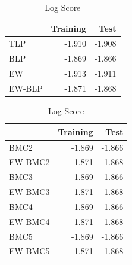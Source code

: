 \documentclass[
]{article}
\begin{document}
\begin{table}[H]
\caption{\label{tab:unnamed-chunk-5}Log Score}

\centering
\fontsize{8}{10}\selectfont
\begin{tabular}[t]{lrr}
\toprule
  & Training & Test\\
\midrule
TLP & -1.910 & -1.908\\
BLP & -1.869 & -1.866\\
EW & -1.913 & -1.911\\
EW-BLP & -1.871 & -1.868\\
\bottomrule
\end{tabular}
\centering
\begin{tabular}[t]{lrr}
\toprule
  & Training & Test\\
\midrule
BMC2 & -1.869 & -1.866\\
EW-BMC2 & -1.871 & -1.868\\
BMC3 & -1.869 & -1.866\\
EW-BMC3 & -1.871 & -1.868\\
BMC4 & -1.869 & -1.866\\
\addlinespace
EW-BMC4 & -1.871 & -1.868\\
BMC5 & -1.869 & -1.866\\
EW-BMC5 & -1.871 & -1.868\\
\bottomrule
\end{tabular}
\end{table}
\end{document}
